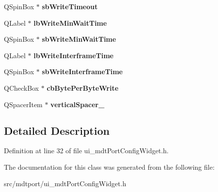 \begin{DoxyCompactItemize}
\item 
\hypertarget{class_ui__mdt_port_config_widget_a146b41c99efbf3042b3eda59b18d3fe8}{
QSpinBox $\ast$ {\bfseries sbWriteTimeout}}
\label{class_ui__mdt_port_config_widget_a146b41c99efbf3042b3eda59b18d3fe8}

\item 
\hypertarget{class_ui__mdt_port_config_widget_a0a810127fbdacd283615f23c7e7066f1}{
QLabel $\ast$ {\bfseries lbWriteMinWaitTime}}
\label{class_ui__mdt_port_config_widget_a0a810127fbdacd283615f23c7e7066f1}

\item 
\hypertarget{class_ui__mdt_port_config_widget_a4740ead5e15cd5a13200123494aabdd4}{
QSpinBox $\ast$ {\bfseries sbWriteMinWaitTime}}
\label{class_ui__mdt_port_config_widget_a4740ead5e15cd5a13200123494aabdd4}

\item 
\hypertarget{class_ui__mdt_port_config_widget_ab8640cb5cf95125b496bfbbaff548564}{
QLabel $\ast$ {\bfseries lbWriteInterframeTime}}
\label{class_ui__mdt_port_config_widget_ab8640cb5cf95125b496bfbbaff548564}

\item 
\hypertarget{class_ui__mdt_port_config_widget_afe980ec9ae205856bc2bb476feb91d32}{
QSpinBox $\ast$ {\bfseries sbWriteInterframeTime}}
\label{class_ui__mdt_port_config_widget_afe980ec9ae205856bc2bb476feb91d32}

\item 
\hypertarget{class_ui__mdt_port_config_widget_a7365d7de9acfd1541849b65ffa1d9cae}{
QCheckBox $\ast$ {\bfseries cbBytePerByteWrite}}
\label{class_ui__mdt_port_config_widget_a7365d7de9acfd1541849b65ffa1d9cae}

\item 
\hypertarget{class_ui__mdt_port_config_widget_aefe443f81cd551a9b904a999883ab490}{
QSpacerItem $\ast$ {\bfseries verticalSpacer\_}}
\label{class_ui__mdt_port_config_widget_aefe443f81cd551a9b904a999883ab490}

\end{DoxyCompactItemize}


\subsection{Detailed Description}


Definition at line 32 of file ui\_\-mdtPortConfigWidget.h.



The documentation for this class was generated from the following file:\begin{DoxyCompactItemize}
\item 
src/mdtport/ui\_\-mdtPortConfigWidget.h\end{DoxyCompactItemize}
